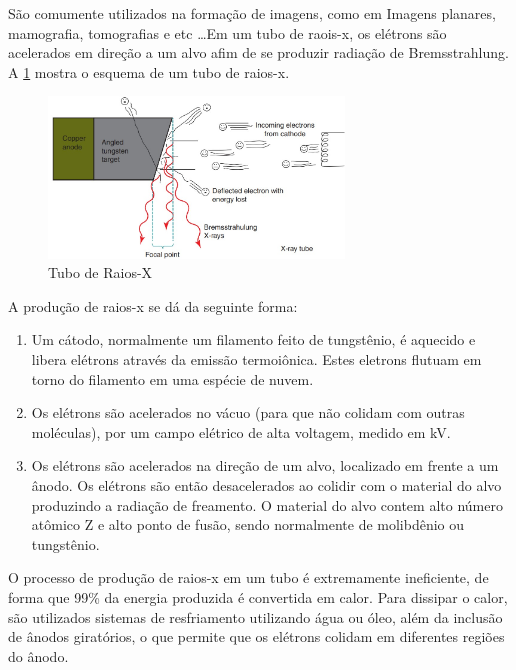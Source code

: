 \documentclass[11pt,a4paper]{article}
\begin{document}
    São comumente utilizados na formação de imagens, como em Imagens planares, mamografia, tomografias  e etc \dots Em um tubo de raois-x, os elétrons são acelerados em direção a um alvo afim de se produzir radiação de Bremsstrahlung. A \ref{fig:tuboDeRaiosX} mostra o esquema de um tubo de raios-x.

                    \begin{figure}[h]
                        \centering
                        \includegraphics[width=0.7\textwidth]{Imagens/tuboDeRaiosX.jpg}
                        \caption{Tubo de Raios-X}
                        \label{fig:tuboDeRaiosX}
                    \end{figure}
                
    A produção de raios-x se dá da seguinte forma:

	\begin{enumerate}
		\item Um cátodo, normalmente um filamento feito de tungstênio, é aquecido e libera elétrons através da emissão termoiônica. Estes eletrons flutuam em torno do filamento em uma espécie de nuvem.
		\item Os elétrons são acelerados no vácuo (para que não colidam com outras moléculas), por um campo elétrico de alta voltagem, medido em kV. 
		\item Os elétrons são acelerados na direção de um alvo, localizado em frente a um ânodo. Os elétrons são então desacelerados ao colidir com o material do alvo produzindo a radiação de freamento. O material do alvo contem alto número atômico Z e alto ponto de fusão, sendo normalmente de molibdênio ou tungstênio. 
	\end{enumerate}							            

    O processo de produção de raios-x em um tubo é extremamente ineficiente, de forma que 99\% da energia produzida é convertida em calor. Para dissipar o calor, são utilizados sistemas de resfriamento utilizando água ou óleo, além da inclusão de ânodos giratórios, o que permite que os elétrons colidam em diferentes regiões do ânodo.
\end{document}
